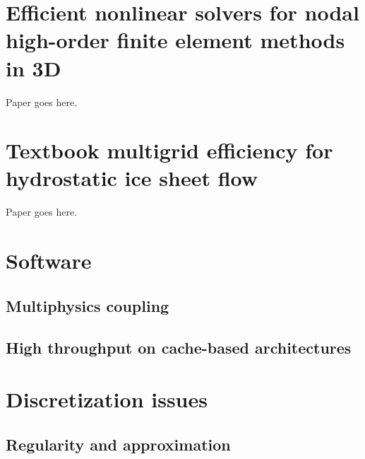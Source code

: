 \documentclass[a4paper,twoside,11pt,pdftex]{report}
\begin{document}
%       

%       

%    
\chapter{Efficient nonlinear solvers for nodal high-order finite element methods in 3D}\label{chap:dohp}
Paper goes here.
\cleardoublepage

\chapter{Textbook multigrid efficiency for hydrostatic ice sheet flow}\label{chap:tme-ice}
Paper goes here.

\cleardoublepage
\chapter{Software}\label{chap:software}
\section{Multiphysics coupling}\label{sec:multiphysics}


\section{High throughput on cache-based architectures}\label{sec:throughput}


\cleardoublepage
\chapter{Discretization issues}\label{chap:discretization}
\section{Regularity and approximation}\label{sec:regularity}

\end{document}
